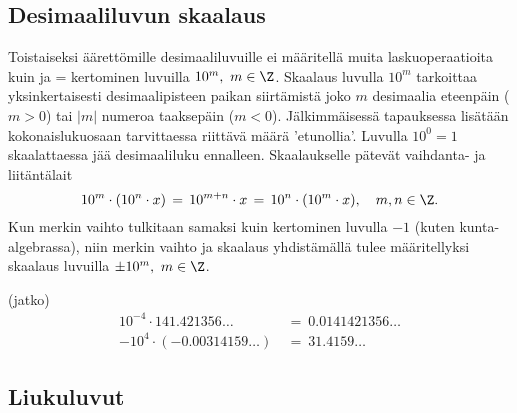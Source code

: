\subsection*{Desimaaliluvun skaalaus}

Toistaiseksi äärettömille desimaaliluvuille ei määritellä muita laskuoperaatioita kuin
 ja  = kertominen luvuilla $10^m,\ m\in\Z$. Skaalaus
luvulla $10^m$ tarkoittaa yksinkertaisesti desimaalipisteen paikan siirtämistä joko $m$
desimaalia eteenpäin ($m>0$) tai $|m|$ numeroa taaksepäin ($m<0$). Jälkimmäisessä tapauksessa
lisätään kokonaislukuosaan tarvittaessa riittävä määrä 'etunollia'. Luvulla $10^0=1$ 
skaalattaessa jää desimaaliluku ennalleen. Skaalaukselle pätevät vaihdanta- ja
liitäntälait 
\[
10^m \cdot (10^n \cdot x) \,=\, 10^{m+n} \cdot x 
                          \,=\, 10^n \cdot (10^m \cdot x), \quad m,n\in\Z.
\]
Kun merkin vaihto tulkitaan samaksi kuin kertominen luvulla $-1$ (kuten kunta-algebrassa),
niin merkin vaihto ja skaalaus yhdistämällä tulee määritellyksi skaalaus luvuilla
$\pm 10^m,\ m\in\Z$. 
\jatko\jatko \begin{Exa} (jatko)
\begin{align*}
 10^{-4} \cdot 141.421356 \ldots\  &=\ 0.0141421356 \ldots \\
 -10^4 \cdot (-0.00314159 \ldots)\ &=\ 31.4159 \ldots
\end{align*}
\end{Exa} \seur

\subsection*{Liukuluvut}
%

